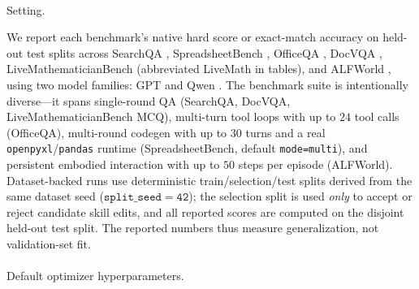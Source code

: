 \documentclass[
]{article}
\makeatletter
\let\oldparagraph\paragraph
\renewcommand{\paragraph}{
    \@ifstar
      \xxxParagraphStar
      \xxxParagraphNoStar
  }
\newcommand{\xxxParagraphStar}[1]{\oldparagraph*{#1}\mbox{}}
\newcommand{\xxxParagraphNoStar}[1]{\oldparagraph{#1}\mbox{}}
\newcommand{\passthrough}[1]{#1}
\makeatother
\begin{document}
\paragraph{Setting.}\label{setting.}

We report each benchmark's native hard score or exact-match accuracy on
held-out test splits across SearchQA \citep{dunn2017searchqa},
SpreadsheetBench \citep{spreadsheetbench}, OfficeQA
\citep{opsahl2026officeqa}, DocVQA \citep{mathew2021docvqa},
LiveMathematicianBench
\citep{he2026livemathematicianbenchlivebenchmarkmathematicianlevel}
(abbreviated LiveMath in tables), and ALFWorld \citep{alfworld}, using
two model families: GPT \citep{openai2026gpt54} and Qwen
\citep{qwen3.5, qwen36_35b_a3b}. The benchmark suite is intentionally
diverse---it spans single-round QA (SearchQA, DocVQA,
LiveMathematicianBench MCQ), multi-turn tool loops with up to \(24\)
tool calls (OfficeQA), multi-round codegen with up to \(30\) turns and a
real \passthrough{\lstinline!openpyxl!}/\passthrough{\lstinline!pandas!}
runtime (SpreadsheetBench, default
\passthrough{\lstinline!mode=multi!}), and persistent embodied
interaction with up to \(50\) steps per episode (ALFWorld).
Dataset-backed runs use deterministic train/selection/test splits
derived from the same dataset seed (\(\mathtt{split\_seed=42}\)); the
selection split is used \emph{only} to accept or reject candidate skill
edits, and all reported scores are computed on the disjoint held-out
test split. The reported numbers thus measure generalization, not
validation-set fit.

\paragraph{Default optimizer
hyperparameters.}\label{default-optimizer-hyperparameters.}
\end{document}
